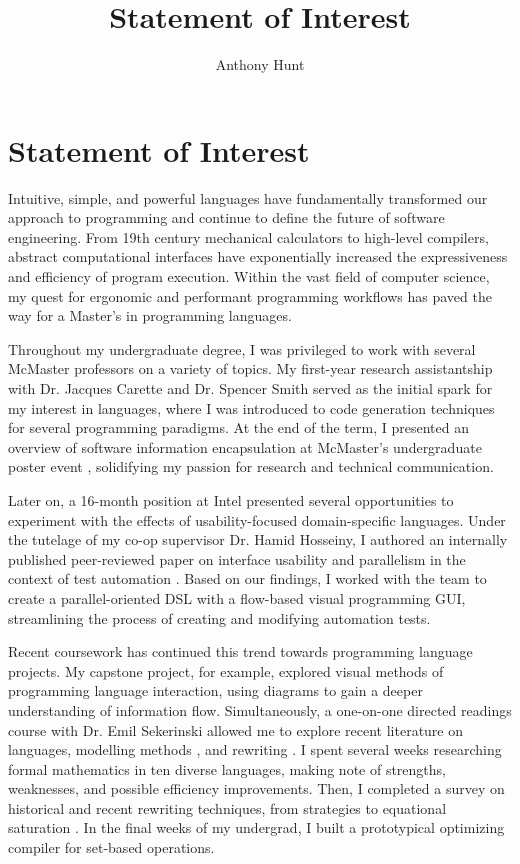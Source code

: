 \documentclass[11pt]{article}
\title{Statement of Interest}
\author{Anthony Hunt}
\begin{document}
\maketitle

\newpage

\section*{Statement of Interest}

Intuitive, simple, and powerful languages have fundamentally transformed our approach to programming and continue to define the future of software engineering. From 19th century mechanical calculators to high-level compilers, abstract computational interfaces have exponentially increased the expressiveness and efficiency of program execution. Within the vast field of computer science, my quest for ergonomic and performant programming workflows has paved the way for a Master's in programming languages.

Throughout my undergraduate degree, I was privileged to work with several McMaster professors on a variety of topics. My first-year research assistantship with Dr. Jacques Carette and Dr. Spencer Smith served as the initial spark for my interest in languages, where I was introduced to code generation techniques for several programming paradigms. At the end of the term, I presented an overview of software information encapsulation at McMaster's undergraduate poster event \cite{hunt2021information}, solidifying my passion for research and technical communication.

Later on, a 16-month position at Intel presented several opportunities to experiment with the effects of usability-focused domain-specific languages. Under the tutelage of my co-op supervisor Dr. Hamid Hosseiny, I authored an internally published peer-reviewed paper on interface usability and parallelism in the context of test automation \cite{hunt2024memautogui}. Based on our findings, I worked with the team to create a parallel-oriented DSL with a flow-based visual programming GUI, streamlining the process of creating and modifying automation tests.

Recent coursework has continued this trend towards programming language projects. My capstone project, for example, explored visual methods of programming language interaction, using diagrams to gain a deeper understanding of information flow. Simultaneously, a one-on-one directed readings course with Dr. Emil Sekerinski allowed me to explore recent literature on languages, modelling methods \cite{eventBBook}, and rewriting \cite{baader1998term}. I spent several weeks researching formal mathematics in ten diverse languages, making note of strengths, weaknesses, and possible efficiency improvements. Then, I completed a survey on historical and recent rewriting techniques, from strategies \cite{elco1998building} to equational saturation \cite{tate2009equality}. In the final weeks of my undergrad, I built a prototypical optimizing compiler for set-based operations.
\end{document}
